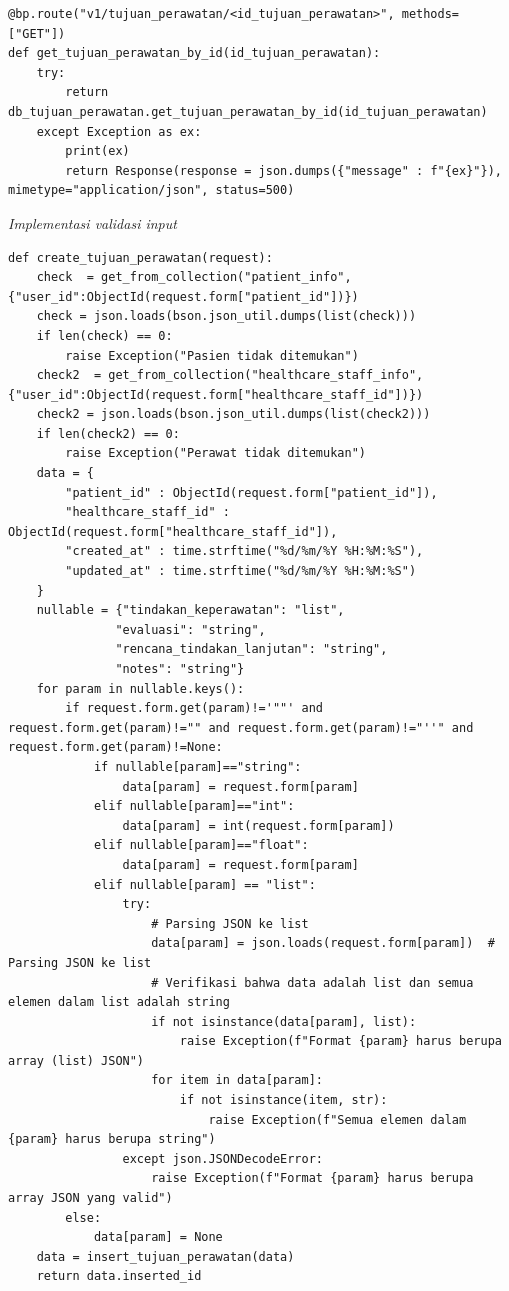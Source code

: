 \begin{enumerate}
\begin{lstlisting}
@bp.route("v1/tujuan_perawatan/<id_tujuan_perawatan>", methods=["GET"])
def get_tujuan_perawatan_by_id(id_tujuan_perawatan):
    try:
        return db_tujuan_perawatan.get_tujuan_perawatan_by_id(id_tujuan_perawatan)
    except Exception as ex:
        print(ex)
        return Response(response = json.dumps({"message" : f"{ex}"}), mimetype="application/json", status=500)
\end{lstlisting}
\textit{Implementasi validasi input}
\begin{lstlisting}
def create_tujuan_perawatan(request):
    check  = get_from_collection("patient_info",{"user_id":ObjectId(request.form["patient_id"])})
    check = json.loads(bson.json_util.dumps(list(check)))
    if len(check) == 0:
        raise Exception("Pasien tidak ditemukan")
    check2  = get_from_collection("healthcare_staff_info",{"user_id":ObjectId(request.form["healthcare_staff_id"])})
    check2 = json.loads(bson.json_util.dumps(list(check2)))
    if len(check2) == 0:
        raise Exception("Perawat tidak ditemukan")
    data = {
        "patient_id" : ObjectId(request.form["patient_id"]),
        "healthcare_staff_id" : ObjectId(request.form["healthcare_staff_id"]),
        "created_at" : time.strftime("%d/%m/%Y %H:%M:%S"),
        "updated_at" : time.strftime("%d/%m/%Y %H:%M:%S")
    }
    nullable = {"tindakan_keperawatan": "list",
               "evaluasi": "string",
               "rencana_tindakan_lanjutan": "string",
               "notes": "string"}
    for param in nullable.keys():
        if request.form.get(param)!='""' and request.form.get(param)!="" and request.form.get(param)!="''" and request.form.get(param)!=None:
            if nullable[param]=="string":
                data[param] = request.form[param]
            elif nullable[param]=="int":
                data[param] = int(request.form[param])
            elif nullable[param]=="float":
                data[param] = request.form[param]
            elif nullable[param] == "list":
                try:
                    # Parsing JSON ke list
                    data[param] = json.loads(request.form[param])  # Parsing JSON ke list
                    # Verifikasi bahwa data adalah list dan semua elemen dalam list adalah string
                    if not isinstance(data[param], list):
                        raise Exception(f"Format {param} harus berupa array (list) JSON")
                    for item in data[param]:
                        if not isinstance(item, str):
                            raise Exception(f"Semua elemen dalam {param} harus berupa string")
                except json.JSONDecodeError:
                    raise Exception(f"Format {param} harus berupa array JSON yang valid")
        else:
            data[param] = None
    data = insert_tujuan_perawatan(data)
    return data.inserted_id
\end{lstlisting}


\end{enumerate}
